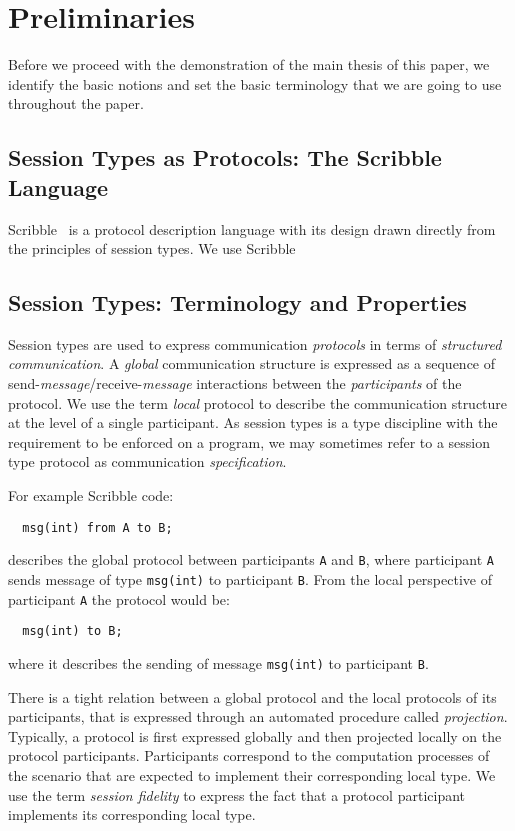 \section{Preliminaries}

Before we proceed with the demonstration of the main thesis
of this paper, we identify the basic notions and set the basic
terminology that we are going to use throughout the paper.

\subsection{Session Types as Protocols: The Scribble Language}

Scribble~\cite{} is a protocol description language with its design
drawn directly from the principles of session types. We use Scribble

\subsection{Session Types: Terminology and Properties}

Session types are used to express communication
{\em protocols} in terms of {\em structured communication}.
A {\em global} communication structure is expressed 
as a sequence of send-{\em message}/receive-{\em message}
interactions between the {\em participants} of the protocol.
We use the term {\em local} protocol to describe
the communication structure at the level of a single participant.
As session types is a type discipline with the requirement to
be enforced on a program, we may sometimes refer to a session type
protocol as communication {\em specification}.

For example Scribble code:
%
\begin{lstlisting}
  msg(int) from A to B;
\end{lstlisting}
%
describes the global protocol between participants \lstinline|A| and \lstinline|B|,
where participant \lstinline|A| sends message of type \lstinline|msg(int)|
to participant \lstinline|B|. From the local perspective of participant
\lstinline|A| the protocol would be:
%
\begin{lstlisting}
  msg(int) to B;
\end{lstlisting}
%
where it describes the sending of message \lstinline|msg(int)|
to participant \lstinline|B|.

There is a tight relation between a global protocol and the
local protocols of its participants, that is expressed
through an automated procedure called {\em projection}.
Typically, a protocol is first expressed globally and then
projected locally on the protocol participants. Participants
correspond to the computation processes of the scenario
that are expected to implement their corresponding local type.
We use the term {\em session fidelity} to express the fact
that a protocol participant implements its corresponding local type.

